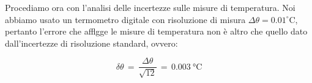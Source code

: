 Procediamo ora con l'analisi delle incertezze sulle misure di temperatura. Noi abbiamo usato un termometro digitale con risoluzione di misura $\Delta \theta = 0.01 ^\circ$C, pertanto l'errore che afflgge le misure di temperatura non è altro che quello dato dall'incertezze di risoluzione standard, ovvero:

\begin{equation*}
	\delta \theta \,=\, \frac{\Delta \theta}{\sqrt{12}} \,=\, \SI{0.003}{\celsius}
\end{equation*}
%

%

%

%

